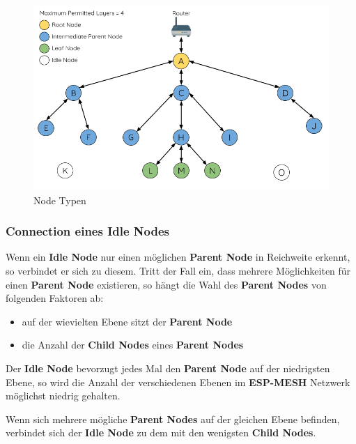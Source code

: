 \begin{figure}[H] \begin{center}
    \includegraphics[scale=0.5]{diagrams/mesh-node-types.png}
    \caption{Node Typen \cite{esp-mesh}}
    \end{center}    
\end{figure}

\subsubsection{Connection eines Idle Nodes}
Wenn ein \textbf{Idle Node} nur einen möglichen \textbf{Parent Node} in Reichweite erkennt, so verbindet er sich zu diesem. Tritt der Fall ein, dass mehrere Möglichkeiten für einen \textbf{Parent Node} existieren, so hängt die Wahl des \textbf{Parent Nodes} von folgenden Faktoren ab:

\begin{itemize}
    \item auf der wievielten Ebene sitzt der \textbf{Parent Node}
    \item die Anzahl der \textbf{Child Nodes} eines \textbf{Parent Nodes}
\end{itemize}

Der \textbf{Idle Node} bevorzugt jedes Mal den \textbf{Parent Node} auf der niedrigsten Ebene, so wird die Anzahl der verschiedenen Ebenen im \textbf{ESP-MESH} Netzwerk möglichst niedrig gehalten.

Wenn sich mehrere mögliche \textbf{Parent Nodes} auf der gleichen Ebene befinden, verbindet sich der \textbf{Idle Node} zu dem mit den wenigsten \textbf{Child Nodes}.

